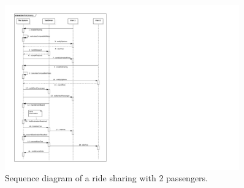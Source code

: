 \begin{figure}
	\includegraphics[width=0.9\textwidth]{diagrams/sequence_ride_sharing.pdf}
	\caption{Sequence diagram of a ride sharing with 2 passengers.}
	\label{fig:sequence-sharing}
\end{figure}

